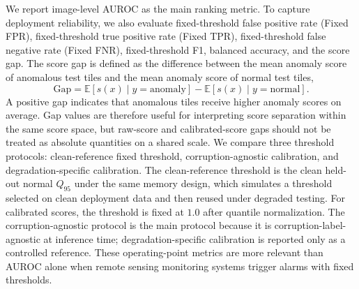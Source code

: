 \documentclass[remotesensing,article,submit,pdftex,moreauthors]{Definitions/mdpi}
\begin{document}
We report image-level AUROC as the main ranking metric. To capture deployment reliability, we also evaluate fixed-threshold false positive rate (Fixed FPR), fixed-threshold true positive rate (Fixed TPR), fixed-threshold false negative rate (Fixed FNR), fixed-threshold F1, balanced accuracy, and the score gap. The score gap is defined as the difference between the mean anomaly score of anomalous test tiles and the mean anomaly score of normal test tiles,
\begin{equation}
\mathrm{Gap}=\mathbb{E}[s(x)\mid y=\mathrm{anomaly}]-\mathbb{E}[s(x)\mid y=\mathrm{normal}].
\end{equation}
A positive gap indicates that anomalous tiles receive higher anomaly scores on average. Gap values are therefore useful for interpreting score separation within the same score space, but raw-score and calibrated-score gaps should not be treated as absolute quantities on a shared scale. We compare three threshold protocols: clean-reference fixed threshold, corruption-agnostic calibration, and degradation-specific calibration. The clean-reference threshold is the clean held-out normal $Q_{95}$ under the same memory design, which simulates a threshold selected on clean deployment data and then reused under degraded testing. For calibrated scores, the threshold is fixed at $1.0$ after quantile normalization. The corruption-agnostic protocol is the main protocol because it is corruption-label-agnostic at inference time; degradation-specific calibration is reported only as a controlled reference. These operating-point metrics are more relevant than AUROC alone when remote sensing monitoring systems trigger alarms with fixed thresholds.

\begin{table}[!htbp]
\caption{Remote sensing degradation protocol and matched-severity setting used in the experiments. We use the same corruption severity for mixed-memory construction and degraded testing, and reserve unseen-severity analysis for a dedicated evaluation.}
\label{tab:degradation-details}
\centering
\small
\setlength{\tabcolsep}{4pt}
\end{table}
\vspace{-4pt}
\end{document}
